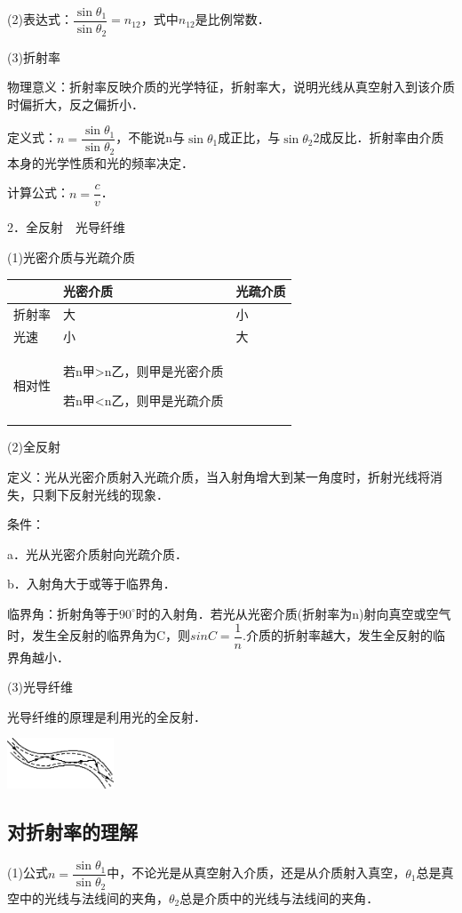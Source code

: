 (2)表达式：$\dfrac{\sin\theta_1}{\sin\theta_2}=n_{12}$，式中$n_{12}$是比例常数．

(3)折射率

物理意义：折射率反映介质的光学特征，折射率大，说明光线从真空射入到该介质时偏折大，反之偏折小．

定义式：$n=\dfrac{\sin\theta_1}{\sin\theta_2}$，不能说n与$\sin \theta_1$成正比，与$\sin\theta_2$2成反比．折射率由介质本身的光学性质和光的频率决定．

计算公式：$n=\dfrac{c}{v}$．

2．全反射　光导纤维

(1)光密介质与光疏介质

\begin{longtable}[]{@{}m{1.5cm}m{5cm}m{4cm}@{}}
\toprule
& 
光密介质
&
光疏介质
\tabularnewline
\midrule
\endhead
折射率 & 大 & 小\tabularnewline
光速 & 小 & 大\tabularnewline

相对性&
若n甲\textgreater n乙，则甲是光密介质

若n甲\textless n乙，则甲是光疏介质
&
\tabularnewline
\bottomrule
\end{longtable}

(2)全反射

定义：光从光密介质射入光疏介质，当入射角增大到某一角度时，折射光线将消失，只剩下反射光线的现象．

条件：

a．光从光密介质射向光疏介质．

b．入射角大于或等于临界角．

临界角：折射角等于$90^\circ$时的入射角．若光从光密介质(折射率为n)射向真空或空气时，发生全反射的临界角为C，则$sinC=\dfrac{1}{n}$.介质的折射率越大，发生全反射的临界角越小．

(3)光导纤维

光导纤维的原理是利用光的全反射．

\begin{center}\includegraphics[width=1.25486in,height=0.59444in]{media/image546.png}\end{center}
\subsection{对折射率的理解}

(1)公式$n=\dfrac{\sin\theta_1}{\sin\theta_2}$中，不论光是从真空射入介质，还是从介质射入真空，$\theta_1$总是真空中的光线与法线间的夹角，$\theta_2$总是介质中的光线与法线间的夹角．

